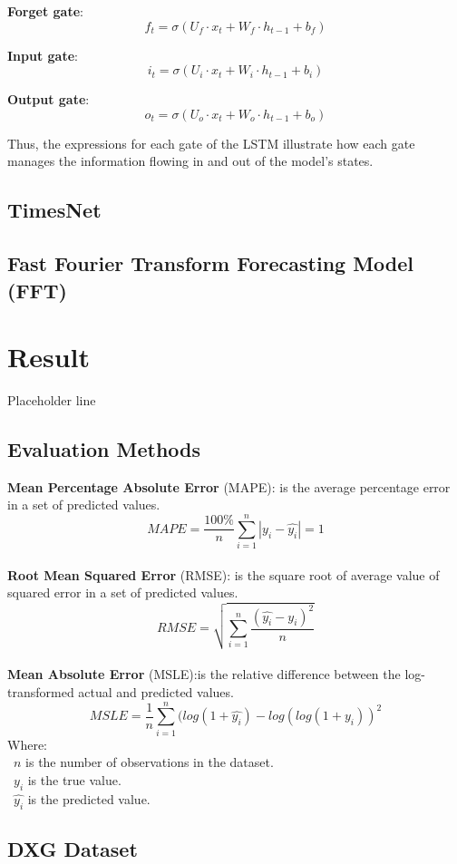 \documentclass{ieeeojies}
\begin{document}
\noindent \textbullet \textbf{ Forget gate}:
\[
f_t = \sigma(U_f \cdot x_t + W_f \cdot h_{t-1} + b_f)
\]

\noindent \textbullet \textbf{ Input gate}:
\[
i_t = \sigma(U_i \cdot x_t + W_i \cdot h_{t-1} + b_i)
\]

\noindent \textbullet \textbf{ Output gate}:
\[
o_t = \sigma(U_o \cdot x_t + W_o \cdot h_{t-1} + b_o)
\]

Thus, the expressions for each gate of the LSTM illustrate how each gate manages the information flowing in and out of the model's states.


  \subsection{TimesNet}
  \subsection{Fast Fourier Transform Forecasting Model (FFT)}


 
\section{Result}
Placeholder line
\subsection{Evaluation Methods}
\textbf{Mean Percentage Absolute Error} (MAPE): is the average percentage error in a set of predicted values.\\
\[MAPE=\frac{100\%}{n}  \sum_{i=1}^{n} |y_i-\hat{y_i} |  = 1 \]\\
\textbf{Root Mean Squared Error} (RMSE): is the square root of average value of squared error in a set of predicted values.\\
\[RMSE=\sqrt{\sum_{i=1}^{n} \frac{(\hat{y_i}-y_i )^2}{n} }\]\\
\textbf{Mean Absolute Error} (MSLE):is the relative difference between the log-transformed actual and predicted values.\\
\[MSLE=\frac{1}{n}\sum_{i=1}^{n}(log(1+\hat{y_i})-log(log(1+y_i))^2\]
Where: \\
	\indent\textbullet\ \(n\) is the number of observations in the dataset.\\
	\indent\textbullet\ \(y_i\)  is the true value.\\
	\indent\textbullet\ \(\hat{y_i}\) is the predicted value.
\subsection{DXG Dataset} 
\end{document}
